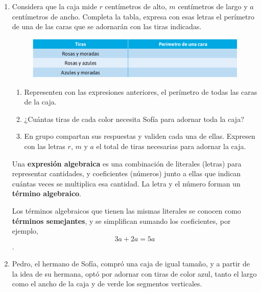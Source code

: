\documentclass[11pt]{book}
\begin{document}
\begin{enumerate}
  \item Considera que la caja mide $r$ centímetros de alto, $m$ centímetros de largo
        y $a$ centímetros de ancho. Completa la tabla, expresa con esas letras el perímetro
        de una de las caras que se adornarán con las tiras indicadas.
        \begin{figure}[H]
          \centering
          \includegraphics[width=.65\linewidth]{tabla_caja.png}
          \label{fig:tabla_caja}
        \end{figure}
        \begin{enumerate}
          \item Representen con las expresiones anteriores, el perímetro de todas las caras de la
                caja.
          \item ¿Cuántas tiras de cada color necesita Sofía para adornar toda la caja?
          \item En grupo compartan sus respuestas y validen cada una de ellas. Expresen con
                las letras $r$, $m$ y $a$ el total de tiras necesarias para adornar la caja.
        \end{enumerate}

        \begin{boxH}
          Una \textbf{expresión algebraica} es una combinación de literales (letras) para representar
          cantidades, y coeficientes (números) junto a ellas que indican cuántas veces se
          multiplica esa cantidad. La letra y el número forman un \textbf{término algebraico}.
        \end{boxH}

        \begin{boxH}
          Los términos algebraicos que tienen las mismas literales se conocen como \textbf{términos semejantes},
          y se simplifican sumando los coeficientes, por ejemplo, \[ 3a + 2a = 5a \].
        \end{boxH}

  \item Pedro, el hermano de Sofía, compró una caja de igual tamaño, y a partir de la idea de
        su hermana, optó por adornar con tiras de color azul, tanto el largo como el ancho de
        la caja y de verde los segmentos verticales.


\end{enumerate}
\end{document}
